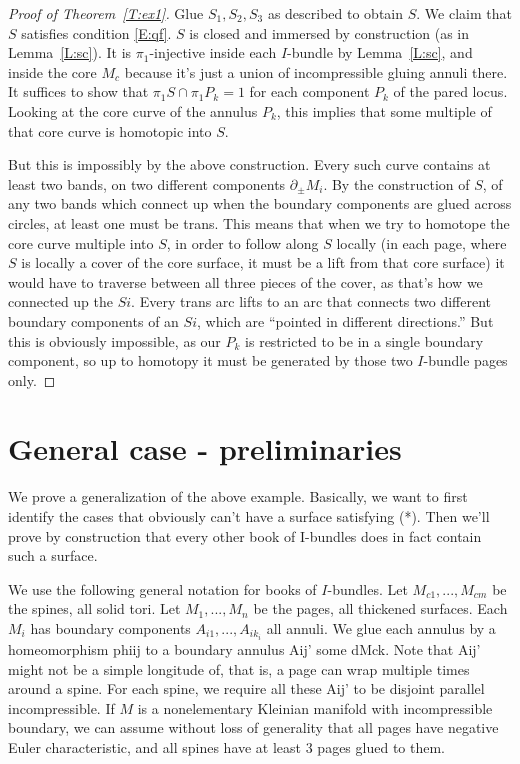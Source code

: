 \documentclass[12pt]{amsart}
\theoremstyle{definition}
\theoremstyle{remark}
\newcommand{\bd}{\partial}
\begin{document}
\begin{proof}[Proof of Theorem~\ref{T:ex1}]
Glue $S_1,S_2,S_3$ as described to obtain $S$. We claim that $S$ satisfies
condition \eqref{E:qf}. $S$ is closed and immersed by construction (as in
Lemma~\ref{L:sc}). It is $\pi_1$-injective inside each $I$-bundle by
Lemma~\ref{L:sc}, and inside the core $M_c$ because it's just a union of
incompressible gluing annuli there. It suffices to show that $\pi_1S \cap
\pi_1P_k = 1$ for each component $P_k$ of the pared locus. Looking at the core
curve of the annulus $P_k$, this implies that some multiple of that core curve
is homotopic into $S$.

But this is impossibly by the above construction. Every such curve contains at
least two bands, on two different components $\bd_\pm M_i$. By the construction
of $S$, of any two bands which connect up when the boundary components are
glued across circles, at least one must be trans. This means that when we try
to homotope the core curve multiple into $S$, in order to follow along $S$
locally (in each page, where $S$ is locally a cover of the core surface, it
must be a lift from that core surface) it would have to traverse between all
three pieces of the cover, as that's how we connected up the $Si$. Every trans
arc lifts to an arc that connects two different boundary components of an $Si$,
which are ``pointed in different directions.'' But this is obviously
impossible, as our $P_k$ is restricted to be in a single boundary component, so
up to homotopy it must be generated by those two $I$-bundle pages only.

\end{proof}

\section{General case - preliminaries}

We prove a generalization of the above example. Basically, we want to first
identify the cases that obviously can't have a surface satisfying (*). Then
we'll prove by construction that every other book of I-bundles does in fact
contain such a surface.

We use the following general notation for books of $I$-bundles. Let
$M_{c1},...,M_{cm}$ be the spines, all solid tori. Let $M_1,...,M_n$ be the
pages, all thickened surfaces. Each $M_i$ has boundary components
$A_{i1},...,A_{ik_i}$ all annuli. We glue each annulus by a homeomorphism phiij
to a boundary annulus Aij' some dMck. Note that Aij' might not be a simple
longitude of, that is, a page can wrap multiple times around a spine. For each
spine, we require all these Aij' to be disjoint parallel incompressible.  If
$M$ is a nonelementary Kleinian manifold with incompressible boundary, we can
assume without loss of generality that all pages have negative Euler
characteristic, and all spines have at least 3 pages glued to them.
\end{document}
